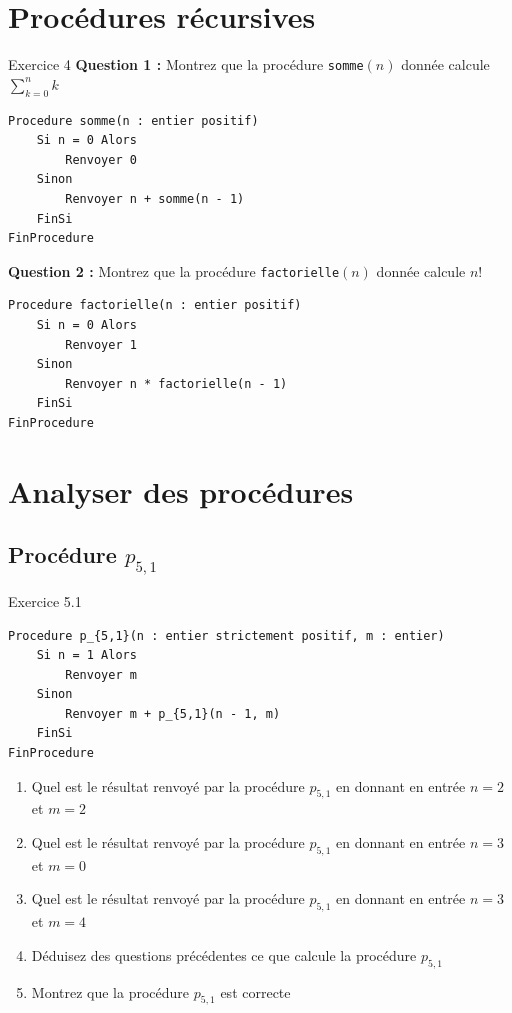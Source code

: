 \documentclass[a4paper,11pt]{article}
\begin{document}
\section{Procédures récursives}

\begin{exercisebox}{Exercice 4}
\textbf{Question 1 :} Montrez que la procédure \texttt{somme}$(n)$ donnée calcule $\sum_{k=0}^{n} k$

\begin{lstlisting}
Procedure somme(n : entier positif)
    Si n = 0 Alors
        Renvoyer 0
    Sinon
        Renvoyer n + somme(n - 1)
    FinSi
FinProcedure
\end{lstlisting}

\textbf{Question 2 :} Montrez que la procédure \texttt{factorielle}$(n)$ donnée calcule $n!$

\begin{lstlisting}
Procedure factorielle(n : entier positif)
    Si n = 0 Alors
        Renvoyer 1
    Sinon
        Renvoyer n * factorielle(n - 1)
    FinSi
FinProcedure
\end{lstlisting}
\end{exercisebox}

\section{Analyser des procédures}

\subsection{Procédure $p_{5,1}$}

\begin{exercisebox}{Exercice 5.1}
\begin{lstlisting}
Procedure p_{5,1}(n : entier strictement positif, m : entier)
    Si n = 1 Alors
        Renvoyer m
    Sinon
        Renvoyer m + p_{5,1}(n - 1, m)
    FinSi
FinProcedure
\end{lstlisting}

\begin{enumerate}
    \item Quel est le résultat renvoyé par la procédure $p_{5,1}$ en donnant en entrée $n = 2$ et $m = 2$
    \item Quel est le résultat renvoyé par la procédure $p_{5,1}$ en donnant en entrée $n = 3$ et $m = 0$
    \item Quel est le résultat renvoyé par la procédure $p_{5,1}$ en donnant en entrée $n = 3$ et $m = 4$
    \item Déduisez des questions précédentes ce que calcule la procédure $p_{5,1}$
    \item Montrez que la procédure $p_{5,1}$ est correcte
\end{enumerate}
\end{exercisebox}
\end{document}
